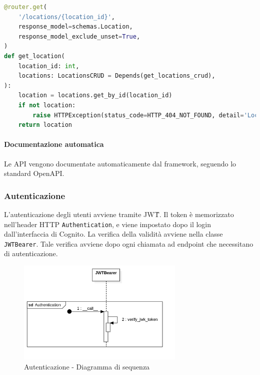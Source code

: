 \begin{lstlisting}[language=Python, caption=Esempio di gestione di un \textit{endpoint}]
@router.get(
    '/locations/{location_id}',
    response_model=schemas.Location,
    response_model_exclude_unset=True,
)
def get_location(
    location_id: int,
    locations: LocationsCRUD = Depends(get_locations_crud),
):
    location = locations.get_by_id(location_id)
    if not location:
        raise HTTPException(status_code=HTTP_404_NOT_FOUND, detail='Location not found')
    return location
\end{lstlisting}

\paragraph{Documentazione automatica}\aCapo
Le API vengono documentate automaticamente dal framework, seguendo lo standard OpenAPI.

\subsubsection{Autenticazione}
L'autenticazione degli utenti avviene tramite JWT\G{}. Il token è memorizzato nell'header HTTP \verb|Authentication|,
e viene impostato dopo il login dall'interfaccia di Cognito. La verifica della validità avviene nella classe \verb|JWTBearer|.
Tale verifica avviene dopo ogni chiamata ad endpoint che necessitano di autenticazione.
\begin{figure}[H]
    \includegraphics[width=8cm]{sezioni/images/sd_api_auth.png}
    \centering
    \caption{Autenticazione - Diagramma di sequenza}
\end{figure}
